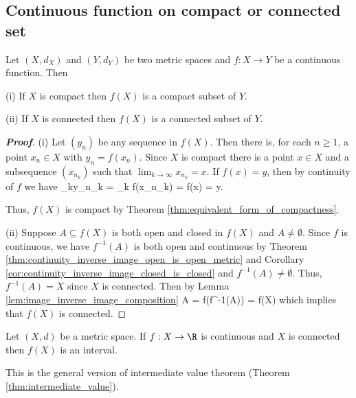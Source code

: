 \subsection{Continuous function on compact or connected set}

\begin{theorem}\label{thm:image_of_compact_or_connected_reserves_property}
Let $(X,d_X)$ and $(Y,d_Y)$ be two metric spaces and $f: X\to Y$ be a continuous function. Then
\ben
\item [(i)] If $X$ is compact then $f(X)$ is a compact subset of $Y$.
\item [(ii)] If $X$ is connected then $f(X)$ is a connected subset of $Y$.
\een
\end{theorem}

\begin{proof}[\bf Proof]%
\ben
\item [(i)] Let $(y_n)$ be any sequence in $f(X)$. Then there is, for each $n\geq 1$, a point $x_n\in X$ with $y_n = f(x_n)$. Since $X$ is compact there is a point $x\in X$ and a subsequence $(x_{n_k})$ such that $\lim_{k\to\infty} x_{n_k} = x$. If $f(x) = y$, then by continuity of $f$ we have 
    \be
    \lim_{k\to\infty}y_{n_k} = \lim_{k\to \infty} f(x_{n_k}) = f(x) = y.
    \ee
    
    Thus, $f(X)$ is compact by Theorem \ref{thm:equivalent_form_of_compactness}.
    
\item [(ii)] Suppose $A\subseteq f(X)$ is both open and closed in $f(X)$ and $A\neq \emptyset$. Since $f$ is continuous, we have $f^{-1}(A)$ is both open and continuous by Theorem \ref{thm:continuity_inverse_image_open_is_open_metric} and Corollary \ref{cor:continuity_inverse_image_closed_is_closed} and $f^{-1}(A) \neq \emptyset$. Thus, $f^{-1}(A) = X$ since $X$ is connected. Then by Lemma \ref{lem:image_inverse_image_composition}
    \be
    A = f(f^{-1}(A)) = f(X)
    \ee
    which implies that $f(X)$ is connected. 
\een
\end{proof}

\begin{corollary}
Let $(X,d)$ be a metric space. If $f:X\to \R$ is continuous and $X$ is connected then $f(X)$ is an interval.
\end{corollary}

\begin{remark}
This is the general version of intermediate value theorem (Theorem \ref{thm:intermediate_value}).
\end{remark}


